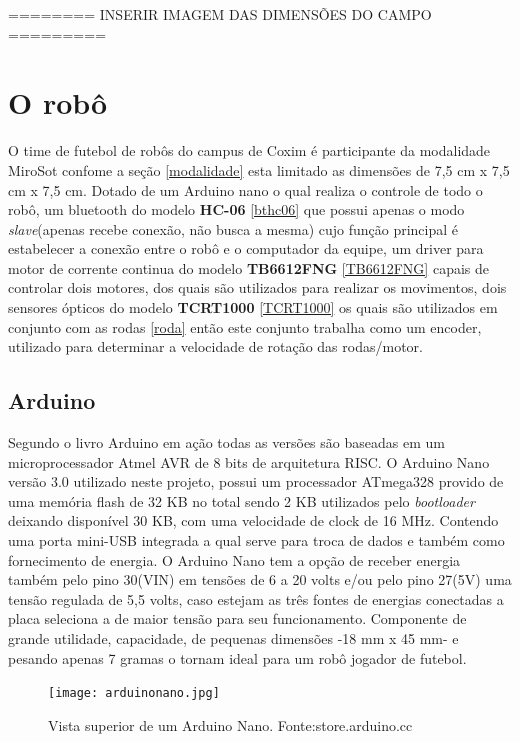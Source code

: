 \documentclass[a4paper,12pt,portuguese]{ufms-cpcx}
\begin{document}
======== INSERIR IMAGEM DAS DIMENSÕES DO CAMPO =========

\chapter{O robô}
O time de futebol de robôs do campus de Coxim é participante da modalidade MiroSot confome a seção \ref{modalidade} esta limitado as dimensões de 7,5 cm x 7,5 cm x 7,5 cm. Dotado de um Arduino nano o qual realiza o controle de todo o robô, um bluetooth do modelo \textbf{HC-06} \ref{bthc06} que possui apenas o modo \textit{slave}(apenas recebe conexão, não busca a mesma) cujo função principal é estabelecer a conexão entre o robô e o computador da equipe, um driver para motor de corrente continua do modelo \textbf{TB6612FNG} \ref{TB6612FNG} capais de controlar dois motores, dos quais são utilizados para realizar os movimentos, dois sensores ópticos do modelo \textbf{TCRT1000} \ref{TCRT1000} os quais são utilizados em conjunto com as rodas \ref{roda} então este conjunto trabalha como um encoder, utilizado para determinar a velocidade de rotação das rodas/motor.

\section{Arduino}\label{arduinonano}
Segundo o livro Arduino em ação\cite{arduinoemacao} todas as versões são baseadas em um microprocessador Atmel AVR de 8 bits de arquitetura RISC. O Arduino Nano versão 3.0 utilizado neste projeto, possui um processador ATmega328 provido de uma memória flash de 32 KB no total sendo 2 KB utilizados pelo \textit{bootloader} deixando disponível 30 KB, com uma velocidade de clock de 16 MHz. Contendo uma porta mini-USB integrada a qual serve para troca de dados e também como fornecimento de energia. O Arduino Nano tem a opção de receber energia também pelo pino 30(VIN) em tensões de 6 a 20 volts e/ou pelo pino 27(5V) uma tensão regulada de 5,5 volts, caso estejam as três fontes de energias conectadas a placa seleciona a de maior tensão para seu funcionamento. Componente de grande utilidade, capacidade, de pequenas dimensões -18 mm x 45 mm- e pesando apenas 7 gramas o tornam ideal para um robô jogador de futebol. 
\begin{figure}[H]
	\centering
	\texttt{[image: arduinonano.jpg]}
	\caption{Vista superior de um Arduino Nano. Fonte:store.arduino.cc}
\end{figure}
\end{document}
